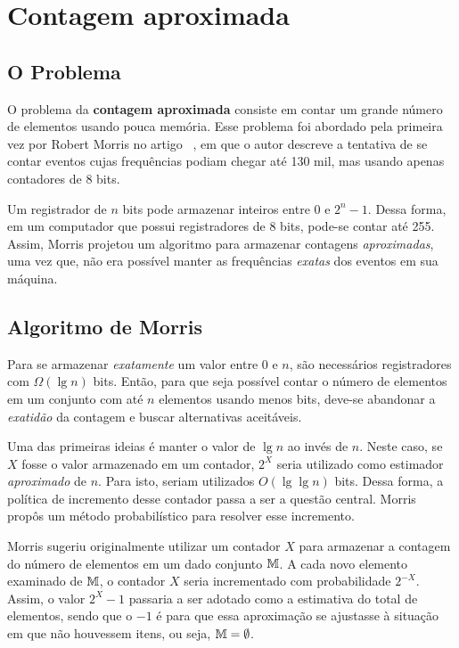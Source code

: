 \chapter{Contagem aproximada}
\label{chap:morris}


\section{O Problema}

O problema da \textbf{contagem aproximada} consiste em contar um grande número de elementos usando pouca memória.  
Esse problema foi abordado pela primeira vez por Robert  Morris no artigo ~\citep{morris:78}, 
em que o autor descreve a tentativa de se contar eventos cujas frequências podiam chegar até 130 mil, mas usando apenas contadores de 8 bits.

Um registrador de $n$ bits pode armazenar inteiros entre $0$ e $2^n-1$. 
Dessa forma, em um computador que possui registradores de 8 bits, pode-se contar até 255.
Assim, Morris projetou um algoritmo para armazenar contagens \textit{aproximadas}, 
uma vez que, não era possível manter as frequências \textit{exatas} dos eventos em sua máquina.

\section{Algoritmo de Morris}

Para se armazenar \textit{exatamente} um valor entre $0$ e $n$, são necessários registradores com $\Omega(\lg n)$ bits. 
Então, para que seja possível contar o número de elementos em um conjunto com até $n$ elementos usando menos bits, 
deve-se abandonar a \textit{exatidão} da contagem e buscar alternativas aceitáveis.

Uma das primeiras ideias é manter o valor de $\lg n$ ao invés de $n$. 
Neste caso, se $X$ fosse o valor armazenado em um contador, $2^X$ seria utilizado como estimador \textit{aproximado} de $n$.
Para isto, seriam utilizados $O(\lg \lg n)$ bits.
Dessa forma, a política de incremento desse contador passa a ser a questão central.
Morris propôs um método probabilístico para resolver esse incremento.

Morris sugeriu originalmente utilizar um contador $X$ para armazenar a contagem do número de elementos em um dado conjunto $\mathbb{M}$.
A cada novo elemento examinado de $\mathbb{M}$, o contador $X$ seria incrementado com probabilidade $2^{-X}$.
Assim, o valor $2^{X} - 1$ passaria a ser adotado como a estimativa do total de elementos, 
sendo que o $-1$ é para que essa aproximação se ajustasse à situação em que não houvessem itens, ou seja, $\mathbb{M} = \emptyset$.

